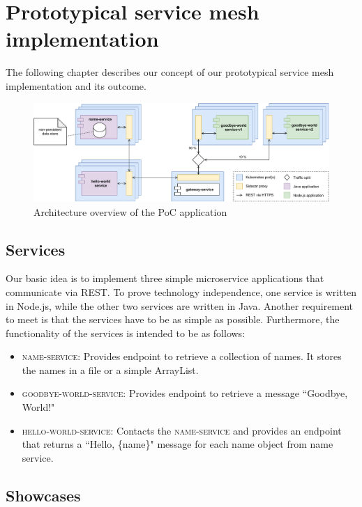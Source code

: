 \section{Prototypical service mesh implementation}

The following chapter describes our concept of our prototypical service mesh implementation and its outcome.

\begin{figure}
    \centering
    \includegraphics[width=\textwidth]{img/diagram-draft.pdf}
    \caption{Architecture overview of the PoC application}
    \label{fig:poc-overview}
\end{figure}

\subsection{Services}

Our basic idea is to implement three simple microservice applications that communicate via REST. To prove technology independence, one service is written in Node.js, while the other two services are written in Java. Another requirement to meet is that the services have to be as simple as possible. Furthermore, the functionality of the services is intended to be as follows:

\begin{itemize}
\item \textsc{name-service}: Provides endpoint to retrieve a collection of names. It stores the names in a file or a simple ArrayList.
\item \textsc{goodbye-world-service}: Provides endpoint to retrieve a message ``Goodbye, World!"
\item \textsc{hello-world-service}: Contacts the \textsc{name-service} and provides an endpoint that returns a ``Hello, \{name\}" message for each name object from name service.
\end{itemize}

\subsection{Showcases}

